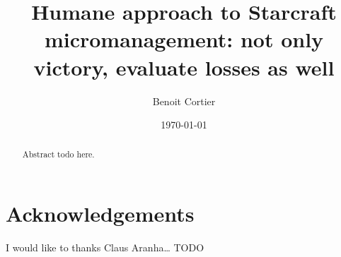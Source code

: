 \documentclass[sigconf]{acmart}
\title{Humane approach to Starcraft micromanagement: not only victory, evaluate losses as well}
\author{Benoit Cortier}
\date{\today}
\begin{document}
\maketitle

\begin{abstract}
    Abstract todo here.
\end{abstract}















\section*{Acknowledgements}

I would like to thanks Claus Aranha… TODO


{}
\end{document}
